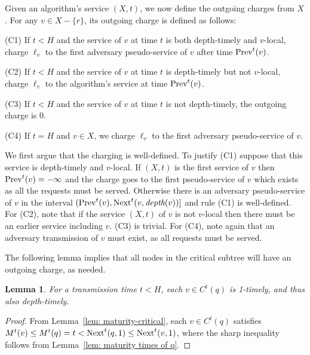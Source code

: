 \documentclass[a4paper]{article}
\newtheorem{lemma}[theorem]{Lemma}
\newcommand{\length}{\ell}
\newcommand{\depth}{\textit{depth}}
\newcommand{\vertmaturity}{M}
\newcommand{\prv}[2]{\mbox{\rm Prev}^#1(#2)}
\newcommand{\nxt}[3]{\mbox{\rm Next}^#1(#2,#3)}
\begin{document}
Given an algorithm's service $(X,t)$, we now define the outgoing
charges from $X$.  For any $v\in X-\{r\}$, its outgoing charge is
defined as follows:
\begin{description}
	
\item{(C1)} If $t<H$ and the service of $v$ at time $t$ is both
  depth-timely and $v$-local, charge $\length_v$ to the first
  adversary pseudo-service of $v$ after time $\prv{t}{v}$.

\item{(C2)} If $t<H$ and the service of $v$ at time $t$ is 
  depth-timely but not $v$-local, charge $\length_v$ 
  to the algorithm's service at time $\prv{t}{v}$.

\item{(C3)} If $t<H$ and the service of $v$ at time $t$ is not
  depth-timely, the outgoing charge is $0$.

\item{(C4)} If $t=H$ and $v\in X$, we charge $\length_v$ to the
first adversary pseudo-service of $v$.
\end{description}

We first argue that the charging is well-defined. 
To justify (C1) suppose that this service is depth-timely and
$v$-local.  If $(X,t)$ is the first service of $v$ then $\prv{t}{v} =
-\infty$ and the charge goes to the first pseudo-service of $v$
which exists as all the requests must be served. Otherwise there
is an adversary pseudo-service of $v$ in the interval
$(\prv{t}{v},\nxt{t}{v}{\depth(v)}]$ and rule (C1) is well-defined.
For (C2), note that if the service $(X,t)$ of $v$ is not $v$-local
then there must be an earlier service including $v$.  (C3) is
trivial. For (C4), note again that an adversary transmission of $v$
must exist, as all requests must be served.

The following lemma implies that
all nodes in the critical subtree will have an outgoing charge, as needed.

\begin{lemma}\label{lem: each v in C is depth-timely}
For a transmission time $t<H$, each $v \in C^t(q)$ is 1-timely, and
thus also depth-timely.
\end{lemma}

\begin{proof}
From Lemma~\ref{lem: maturity-critical}, each $v\in C^t(q)$ satisfies 
$\vertmaturity^t(v) \leq \vertmaturity^t(q) 
					= t 
					< \nxt{t}{q}{1}
					\le \nxt{t}{v}{1}$,
where the sharp inequality follows from Lemma~\ref{lem: maturity times of q}.
\end{proof}
\end{document}
